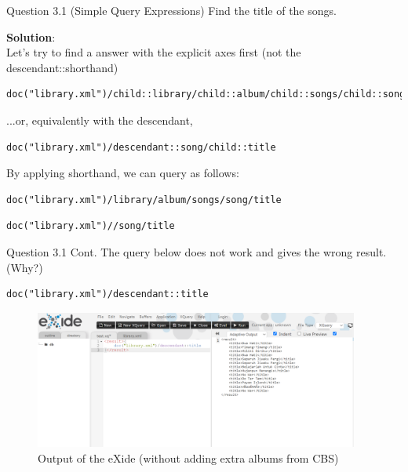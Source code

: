 \begin{frame}[fragile]{Question 3.1 (Simple Query Expressions)}
Find the title of the songs.\\ \vspace{5pt}

\textbf{Solution}: \\
Let's try to find a answer with the explicit axes first (not the descendant::shorthand)
\begin{lstlisting}[style=xml-small-nomargin]
doc("library.xml")/child::library/child::album/child::songs/child::song/child::title
\end{lstlisting}\vspace{5pt}
...or, equivalently with the descendant,
\begin{lstlisting}[style=xml-small-nomargin]
doc("library.xml")/descendant::song/child::title
\end{lstlisting}\vspace{5pt}

By applying shorthand, we can query as follows:
\begin{lstlisting}[style=xml-small-nomargin]
doc("library.xml")/library/album/songs/song/title
\end{lstlisting}

\begin{lstlisting}[style=xml-small-nomargin]
doc("library.xml")//song/title
\end{lstlisting}\vspace{5pt}
\end{frame}


\begin{frame}[fragile]{Question 3.1 Cont.}
The query below does not work and gives the wrong result. (Why?)\\ \vspace{5pt}
\begin{lstlisting}[style=xml-small-nomargin]
doc("library.xml")/descendant::title
\end{lstlisting}

\begin{figure}
	\includegraphics[width=0.95\textwidth,frame]{4221-t7/q3_1_wrong_result.png}
	\caption{Output of the eXide (without adding extra albums from CBS)}
\end{figure}\vspace{-10pt}
\end{frame}
	
